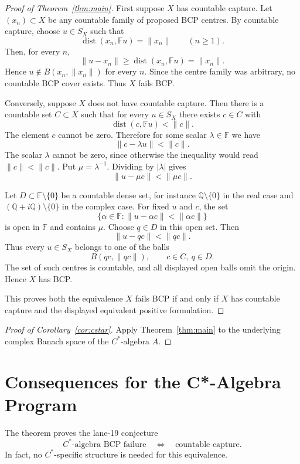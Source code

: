 \documentclass[11pt]{article}
\newcommand{\F}{\mathbb F}
\newcommand{\dist}{\operatorname{dist}}
\begin{document}
\begin{proof}[Proof of Theorem~\ref{thm:main}]
First suppose \(X\) has countable capture.  Let \((x_n)\subset X\) be any
countable family of proposed BCP centres.  By countable capture, choose
\(u\in S_X\) such that
\[
        \dist(x_n,\F u)=\|x_n\|\qquad(n\ge1).
\]
Then, for every \(n\),
\[
        \|u-x_n\|\ge \dist(x_n,\F u)=\|x_n\|.
\]
Hence \(u\notin B(x_n,\|x_n\|)\) for every \(n\).  Since the centre family
was arbitrary, no countable BCP cover exists.  Thus \(X\) fails BCP.

Conversely, suppose \(X\) does not have countable capture.  Then there is a
countable set \(C\subset X\) such that for every \(u\in S_X\) there exists
\(c\in C\) with
\[
        \dist(c,\F u)<\|c\|.
\]
The element \(c\) cannot be zero.  Therefore for some scalar
\(\lambda\in\F\) we have
\[
        \|c-\lambda u\|<\|c\|.
\]
The scalar \(\lambda\) cannot be zero, since otherwise the inequality would
read \(\|c\|<\|c\|\).  Put \(\mu=\lambda^{-1}\).  Dividing by \(|\lambda|\)
gives
\[
        \|u-\mu c\|<\|\mu c\|.
\]

Let \(D\subset\F\setminus\{0\}\) be a countable dense set, for instance
\(\mathbb Q\setminus\{0\}\) in the real case and
\((\mathbb Q+i\mathbb Q)\setminus\{0\}\) in the complex case.  For fixed
\(u\) and \(c\), the set
\[
        \{\alpha\in\F:\|u-\alpha c\|<\|\alpha c\|\}
\]
is open in \(\F\) and contains \(\mu\).  Choose
\(q\in D\) in this open set.  Then
\[
        \|u-qc\|<\|qc\|.
\]
Thus every \(u\in S_X\) belongs to one of the balls
\[
        B(qc,\|qc\|),
        \qquad c\in C,\ q\in D.
\]
The set of such centres is countable, and all displayed open balls omit the
origin.  Hence \(X\) has BCP.

This proves both the equivalence \(X\) fails BCP if and only if \(X\) has
countable capture and the displayed equivalent positive formulation.
\end{proof}

\begin{proof}[Proof of Corollary~\ref{cor:cstar}]
Apply Theorem~\ref{thm:main} to the underlying complex Banach space of the
\(C^*\)-algebra \(A\).
\end{proof}

\section*{Consequences for the C*-Algebra Program}

The theorem proves the lane-19 conjecture
\[
        \text{\(C^*\)-algebra BCP failure}
        \quad\Longleftrightarrow\quad
        \text{countable capture}.
\]
In fact, no \(C^*\)-specific structure is needed for this equivalence.
\end{document}
